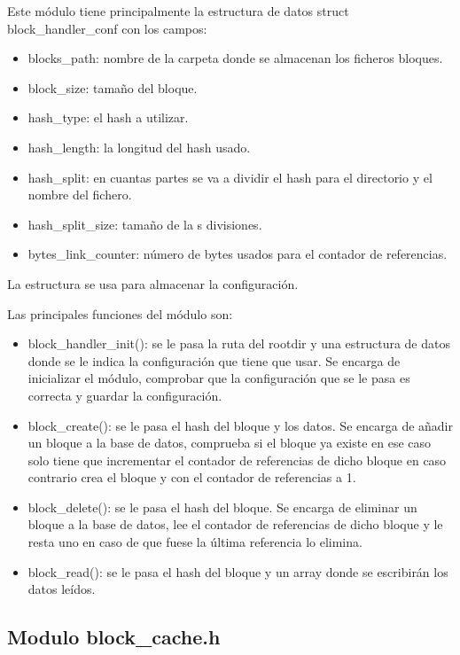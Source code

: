 \documentclass[a4paper,12pt]{article}
\begin{document}
Este módulo tiene principalmente la estructura de datos struct block\_handler\_conf con los campos:

\begin{itemize}
\item blocks\_path: nombre de la carpeta donde se almacenan los ficheros bloques.
\item block\_size: tamaño del bloque.
\item hash\_type: el hash a utilizar.
\item hash\_length: la longitud del hash usado.
\item hash\_split: en cuantas partes se va a dividir el hash para el directorio y el nombre del fichero.
\item hash\_split\_size: tamaño de la s divisiones.
\item bytes\_link\_counter: número de bytes usados para el contador de referencias.
\end{itemize}

La estructura se usa para almacenar la configuración.
\bigskip

Las principales funciones del módulo son:
\begin{itemize}
\item block\_handler\_init(): se le pasa la ruta del rootdir y una estructura de datos donde se le indica la configuración que tiene que usar. Se encarga de inicializar el módulo, comprobar que la configuración que se le pasa es correcta y guardar la configuración.
\item block\_create(): se le pasa el hash del bloque y los datos. Se encarga de añadir un bloque a la base de datos, comprueba si el bloque ya existe en ese caso solo tiene que incrementar el contador de referencias de dicho bloque en caso contrario crea el bloque y con el contador de referencias a 1.
\item block\_delete(): se le pasa el hash del bloque. Se encarga de eliminar un bloque a la base de datos, lee el contador de referencias de dicho bloque y le resta uno en caso de que fuese la última referencia lo elimina.
\item block\_read(): se le pasa el hash del bloque y un array donde se escribirán los datos leídos.
\end{itemize}

\subsection{Modulo block\_cache.h}
\end{document}
